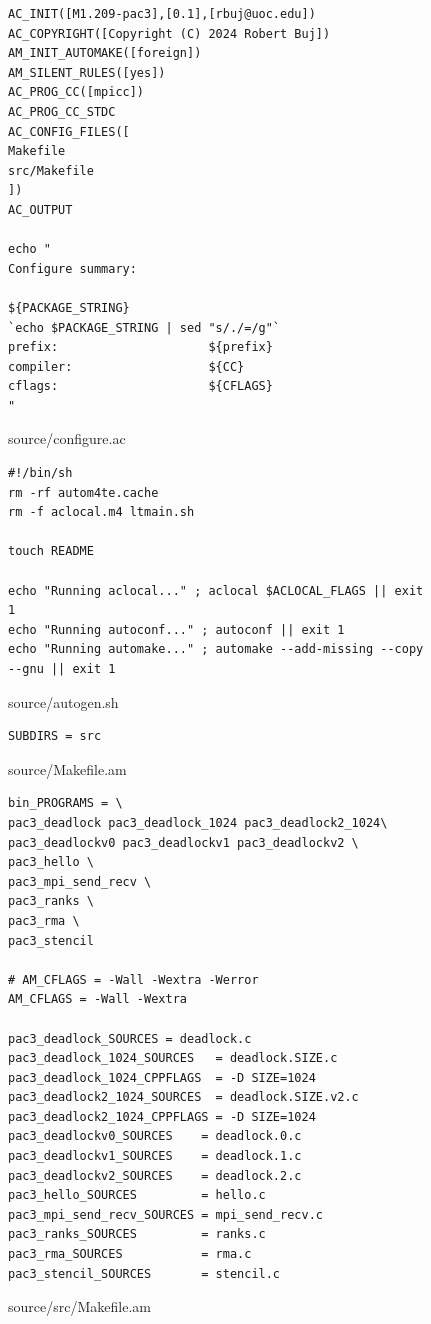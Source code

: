 \documentclass[12pt]{article}
\begin{document}
\begin{figure}[h!]
	\begin{verbatim}
AC_INIT([M1.209-pac3],[0.1],[rbuj@uoc.edu])
AC_COPYRIGHT([Copyright (C) 2024 Robert Buj])
AM_INIT_AUTOMAKE([foreign])
AM_SILENT_RULES([yes])
AC_PROG_CC([mpicc])
AC_PROG_CC_STDC
AC_CONFIG_FILES([
Makefile
src/Makefile
])
AC_OUTPUT

echo "
Configure summary:

${PACKAGE_STRING}
`echo $PACKAGE_STRING | sed "s/./=/g"`
prefix:                     ${prefix}
compiler:                   ${CC}
cflags:                     ${CFLAGS}
"
	\end{verbatim}
	\caption{source/configure.ac}\label{code:mmomp}
\end{figure}

\begin{figure}[h!]
	\begin{verbatim}
#!/bin/sh
rm -rf autom4te.cache
rm -f aclocal.m4 ltmain.sh

touch README

echo "Running aclocal..." ; aclocal $ACLOCAL_FLAGS || exit 1
echo "Running autoconf..." ; autoconf || exit 1
echo "Running automake..." ; automake --add-missing --copy --gnu || exit 1
	\end{verbatim}
	\caption{source/autogen.sh}\label{code:Makefile1}
\end{figure}

\newpage

\begin{figure}[h!]
	\begin{verbatim}
SUBDIRS = src
	\end{verbatim}
	\caption{source/Makefile.am}\label{code:Makefile1}
\end{figure}

\begin{figure}[h!]
	\begin{verbatim}
bin_PROGRAMS = \
pac3_deadlock pac3_deadlock_1024 pac3_deadlock2_1024\
pac3_deadlockv0 pac3_deadlockv1 pac3_deadlockv2 \
pac3_hello \
pac3_mpi_send_recv \
pac3_ranks \
pac3_rma \
pac3_stencil

# AM_CFLAGS = -Wall -Wextra -Werror
AM_CFLAGS = -Wall -Wextra

pac3_deadlock_SOURCES = deadlock.c
pac3_deadlock_1024_SOURCES   = deadlock.SIZE.c
pac3_deadlock_1024_CPPFLAGS  = -D SIZE=1024
pac3_deadlock2_1024_SOURCES  = deadlock.SIZE.v2.c
pac3_deadlock2_1024_CPPFLAGS = -D SIZE=1024
pac3_deadlockv0_SOURCES    = deadlock.0.c
pac3_deadlockv1_SOURCES    = deadlock.1.c
pac3_deadlockv2_SOURCES    = deadlock.2.c
pac3_hello_SOURCES         = hello.c
pac3_mpi_send_recv_SOURCES = mpi_send_recv.c
pac3_ranks_SOURCES         = ranks.c
pac3_rma_SOURCES           = rma.c
pac3_stencil_SOURCES       = stencil.c
	\end{verbatim}
	\caption{source/src/Makefile.am}\label{code:Makefile2}
\end{figure}
\end{document}
